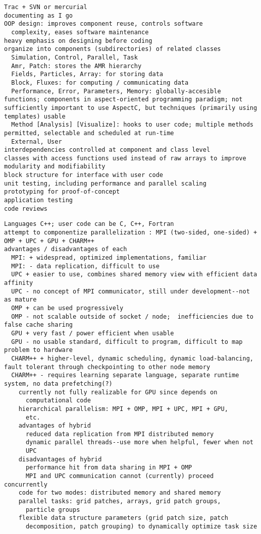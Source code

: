 \documentclass[14pt,letter]{article}
\begin{document}
\begin{verbatim}
Trac + SVN or mercurial
documenting as I go
OOP design: improves component reuse, controls software
  complexity, eases software maintenance
heavy emphasis on designing before coding
organize into components (subdirectories) of related classes
  Simulation, Control, Parallel, Task
  Amr, Patch: stores the AMR hierarchy
  Fields, Particles, Array: for storing data
  Block, Fluxes: for computing / communicating data
  Performance, Error, Parameters, Memory: globally-accesible functions; components in aspect-oriented programming paradigm; not sufficiently important to use AspectC, but techniques (primarily using templates) usable
  Method [Analysis] [Visualize]: hooks to user code; multiple methods permitted, selectable and scheduled at run-time
  External, User
interdependencies controlled at component and class level
classes with access functions used instead of raw arrays to improve modularity and modifiability
block structure for interface with user code
unit testing, including performance and parallel scaling
prototyping for proof-of-concept
application testing
code reviews
\end{verbatim}

\begin{verbatim}
Languages C++; user code can be C, C++, Fortran
attempt to componentize parallelization : MPI (two-sided, one-sided) + OMP + UPC + GPU + CHARM++
advantages / disadvantages of each
  MPI: + widespread, optimized implementations, familiar
  MPI: - data replication, difficult to use
  UPC + easier to use, combines shared memory view with efficient data affinity
  UPC - no concept of MPI communicator, still under development--not as mature
  OMP + can be used progressively
  OMP - not scalable outside of socket / node;  inefficiencies due to false cache sharing
  GPU + very fast / power efficient when usable
  GPU - no usable standard, difficult to program, difficult to map problem to hardware
  CHARM++ + higher-level, dynamic scheduling, dynamic load-balancing, fault tolerant through checkpointing to other node memory
  CHARM++ - requires learning separate language, separate runtime system, no data prefetching(?)
    currently not fully realizable for GPU since depends on
      computational code
    hierarchical parallelism: MPI + OMP, MPI + UPC, MPI + GPU,
      etc.
    advantages of hybrid
      reduced data replication from MPI distributed memory
      dynamic parallel threads--use more when helpful, fewer when not
      UPC
    disadvantages of hybrid
      performance hit from data sharing in MPI + OMP
      MPI and UPC communication cannot (currently) proceed concurrently
    code for two modes: distributed memory and shared memory
    parallel tasks: grid patches, arrays, grid patch groups,
      particle groups
    flexible data structure parameters (grid patch size, patch
      decomposition, patch grouping) to dynamically optimize task size
\end{verbatim}
    
\end{document}
